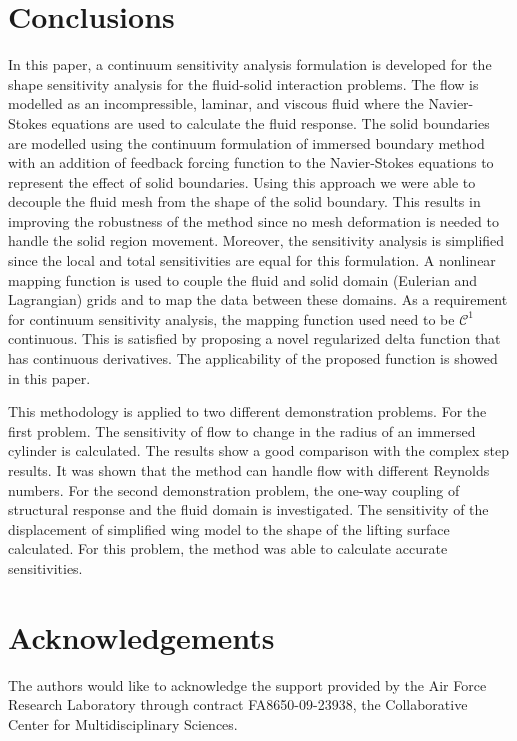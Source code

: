 \documentclass[12pt]{aiaa-pretty}
\begin{document}
\section{Conclusions}
In this paper, a continuum sensitivity analysis formulation is developed for the shape sensitivity analysis for the fluid-solid interaction problems. The flow is modelled as an incompressible, laminar, and viscous fluid where the Navier-Stokes equations are used to calculate the fluid response. The solid boundaries are modelled using the continuum formulation of immersed boundary method with an addition of feedback forcing function to the Navier-Stokes equations to represent the effect of solid boundaries. Using this approach we were able to decouple the fluid mesh from the shape of the solid boundary. This results in improving the robustness of the method since no mesh deformation is needed to handle the solid region movement. Moreover, the sensitivity analysis is simplified since the local and total sensitivities are equal for this formulation. A nonlinear mapping function is used to couple the fluid and solid domain (Eulerian and Lagrangian) grids and to map the data between these domains. As a requirement for continuum sensitivity analysis, the mapping function used need to be $\mathcal{C}^1$ continuous. This is satisfied by proposing a novel regularized delta function that has continuous derivatives. The applicability of the proposed function is showed in this paper.

This methodology is applied to two different demonstration problems. For the first problem. The sensitivity of flow to change in the radius of an immersed cylinder is calculated. The results show a good comparison with the complex step results. It was shown that the method can handle flow with different Reynolds numbers. For the second demonstration problem, the one-way coupling of structural response and the fluid domain is investigated. The sensitivity of the displacement of simplified wing model to the shape of the lifting surface calculated. For this problem, the method was able to calculate accurate sensitivities.
\section*{Acknowledgements}
The authors would like to acknowledge the support provided by the Air Force Research Laboratory through contract FA8650-09-23938, the Collaborative Center for Multidisciplinary Sciences.


\end{document}
